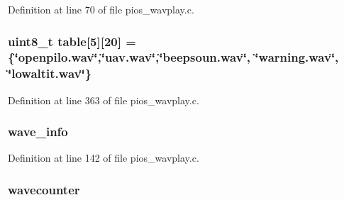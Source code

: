 Definition at line 70 of file pios\-\_\-wavplay.\-c.

\hypertarget{group___w_a_v_e_p_l_a_y_e_r___private___variables_gacad7ec90c8f694c87a4695350cb98d5d}{
\subsubsection[{table}]{ {\bf uint8\-\_\-t} table\mbox{[}5\mbox{]}\mbox{[}20\mbox{]} = \{\char`\"{}openpilo.\-wav\char`\"{},\char`\"{}uav.\-wav\char`\"{},\char`\"{}beepsoun.\-wav\char`\"{}, \char`\"{}warning.\-wav\char`\"{}, \char`\"{}lowaltit.\-wav\char`\"{}\}}}\label{group___w_a_v_e_p_l_a_y_e_r___private___variables_gacad7ec90c8f694c87a4695350cb98d5d}


Definition at line 363 of file pios\-\_\-wavplay.\-c.

\hypertarget{group___w_a_v_e_p_l_a_y_e_r___private___variables_ga174829d299c4713257749f20bfc996f4}{
\subsubsection[{wave\-\_\-info}]{ wave\-\_\-info}}\label{group___w_a_v_e_p_l_a_y_e_r___private___variables_ga174829d299c4713257749f20bfc996f4}


Definition at line 142 of file pios\-\_\-wavplay.\-c.

\hypertarget{group___w_a_v_e_p_l_a_y_e_r___private___variables_ga39e802dfcf3592a17543c656dba18064}{
\subsubsection[{wavecounter}]{ wavecounter}}\label{group___w_a_v_e_p_l_a_y_e_r___private___variables_ga39e802dfcf3592a17543c656dba18064}


